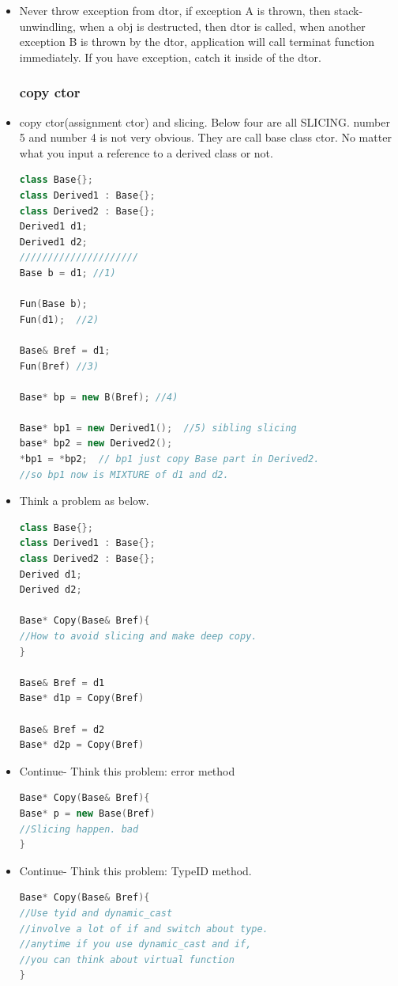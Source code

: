 \documentclass[a4paper,12pt,twoside]{book}
\begin{document}
\begin{itemize}
\item Never throw exception from dtor, if exception A is thrown, then stack-unwindling, when a obj is destructed, then dtor is called, when another exception B is thrown by the dtor, application will call terminat function immediately.  If you have exception, catch it inside of the dtor.

\subsubsection{copy ctor}

\item copy ctor(assignment ctor) and slicing. Below four are all SLICING.  number 5 and number 4 is not very obvious. They are call base class ctor.  No matter what you input a reference to a derived class or not.
\begin{lstlisting}[frame=single, language=c++]
class Base{};
class Derived1 : Base{};
class Derived2 : Base{};
Derived1 d1;
Derived1 d2;
/////////////////////
Base b = d1; //1)

Fun(Base b);
Fun(d1);  //2)

Base& Bref = d1;
Fun(Bref) //3)

Base* bp = new B(Bref); //4)

Base* bp1 = new Derived1();  //5) sibling slicing
base* bp2 = new Derived2();
*bp1 = *bp2;  // bp1 just copy Base part in Derived2.
//so bp1 now is MIXTURE of d1 and d2.
\end{lstlisting}

\item Think a problem as below.
\begin{lstlisting}[frame=single, language=c++]
class Base{};
class Derived1 : Base{};
class Derived2 : Base{};
Derived d1;
Derived d2;

Base* Copy(Base& Bref){
//How to avoid slicing and make deep copy.
}

Base& Bref = d1
Base* d1p = Copy(Bref)

Base& Bref = d2
Base* d2p = Copy(Bref)
\end{lstlisting}

\item Continue- Think this problem: error method
\begin{lstlisting}[frame=single, language=c++]
Base* Copy(Base& Bref){
Base* p = new Base(Bref)
//Slicing happen. bad
}
\end{lstlisting}
\item Continue- Think this problem: TypeID method.
\begin{lstlisting}[frame=single, language=c++]
Base* Copy(Base& Bref){
//Use tyid and dynamic_cast
//involve a lot of if and switch about type.
//anytime if you use dynamic_cast and if,
//you can think about virtual function
}
\end{lstlisting}


\end{itemize}
\end{document}
